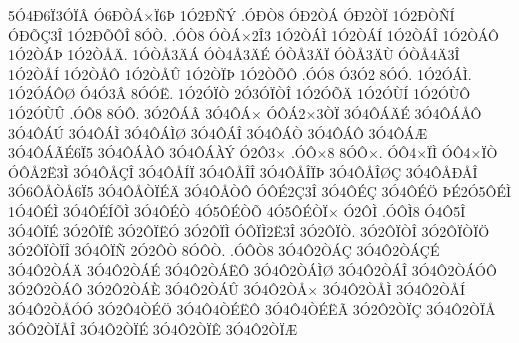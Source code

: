 {5^^d34^^d06^^cf3^^d3^^cf^^c2
^^d36^^d0^^d2^^c1^^d7^^cf6^^de
1^^d32^^d0^^d1^^dd
.^^d3^^d0^^d28
^^d3^^d02^^d2^^c1
^^d3^^d02^^d2^^cf
1^^d32^^d0^^d2^^d1^^cd
^^d3^^d0^^d5^^c73^^ce
1^^d32^^d0^^d5^^d4^^ce
8^^d3^^d2.
.^^d3^^d28
^^d3^^d2^^c1^^d72^^ce3
1^^d32^^d2^^c1^^cc
1^^d32^^d2^^c1^^cd
1^^d32^^d2^^c1^^ce
1^^d32^^d2^^c1^^d4
1^^d32^^d2^^c1^^de
1^^d32^^d2^^c5^^c4.
1^^d3^^d2^^c53^^c4^^c1
^^d3^^d24^^c53^^c4^^c9
^^d3^^d2^^c53^^c4^^cf
^^d3^^d2^^c53^^c4^^d9
^^d3^^d2^^c54^^c43^^ce
1^^d32^^d2^^c5^^cd
1^^d32^^d2^^c5^^d4
1^^d32^^d2^^c5^^db
1^^d32^^d2^^cf^^de
1^^d32^^d2^^d5^^d4
.^^d3^^d38
^^d33^^d32
8^^d3^^d3.
1^^d32^^d3^^c1^^cc.
1^^d32^^d3^^c1^^d4^^d8
^^d34^^d33^^c2
8^^d3^^d3^^cb.
1^^d32^^d3^^cf^^d2
2^^d33^^d3^^cf^^d2^^ce
1^^d32^^d3^^d5^^c4
1^^d32^^d3^^d9^^cd
1^^d32^^d3^^d9^^d4
1^^d32^^d3^^d9^^db
.^^d3^^d48
8^^d3^^d4.
3^^d32^^d4^^c1^^c2
3^^d34^^d4^^c1^^d7
^^d3^^d4^^c12^^d73^^d2^^cf
3^^d34^^d4^^c1^^c4^^c9
3^^d34^^d4^^c1^^c5^^d4
3^^d34^^d4^^c1^^da
3^^d34^^d4^^c1^^cc
3^^d34^^d4^^c1^^cc^^d8
3^^d34^^d4^^c1^^ce
3^^d34^^d4^^c1^^d2
3^^d34^^d4^^c1^^d4
3^^d34^^d4^^c1^^c6
3^^d34^^d4^^c1^^c3^^c96^^cf5
3^^d34^^d4^^c1^^c0^^d4
3^^d34^^d4^^c1^^c0^^dd
^^d32^^d43^^d7
.^^d3^^d4^^d78
8^^d3^^d4^^d7.
^^d3^^d44^^d7^^cf^^cc
^^d3^^d44^^d7^^cf^^d2
^^d3^^d4^^c52^^cb3^^cc
3^^d34^^d4^^c5^^c7^^ce
3^^d34^^d4^^c5^^cd^^cf
3^^d34^^d4^^c5^^ce^^ce
3^^d34^^d4^^c5^^ce^^cf^^de
3^^d34^^d4^^c5^^ce^^d8^^c7
3^^d34^^d4^^c5^^d0^^c5^^ce
3^^d36^^d4^^c5^^d2^^c56^^cf5
3^^d34^^d4^^c5^^d2^^cf^^c9^^c4
3^^d34^^d4^^c5^^d2^^d4
^^d3^^d4^^c92^^c73^^ce
3^^d34^^d4^^c9^^c7
3^^d34^^d4^^c9^^d6
^^de^^c92^^d35^^d4^^c9^^cc
1^^d34^^d4^^c9^^cc
3^^d34^^d4^^c9^^cd^^d5^^cc
3^^d34^^d4^^c9^^d2
4^^d35^^d4^^c9^^d2^^d5
4^^d35^^d4^^c9^^d2^^cf^^d7
^^d32^^d4^^cc
.^^d3^^d4^^cc8
^^d34^^d45^^ce
3^^d34^^d4^^cf^^c9
3^^d32^^d4^^cf^^ca
3^^d32^^d4^^cf^^cb^^d3
3^^d32^^d4^^cf^^cc
^^d3^^d4^^cf^^cc2^^cb3^^ce
3^^d32^^d4^^cf^^d2.
3^^d32^^d4^^cf^^d2^^ce
3^^d32^^d4^^cf^^d2^^cf^^d6
3^^d32^^d4^^cf^^d2^^cf^^ce
3^^d34^^d4^^cf^^d1
2^^d32^^d4^^d2
8^^d3^^d4^^d2.
.^^d3^^d4^^d28
3^^d34^^d42^^d2^^c1^^c7
3^^d34^^d42^^d2^^c1^^c7^^c9
3^^d34^^d42^^d2^^c1^^c4
3^^d34^^d42^^d2^^c1^^c9
3^^d34^^d42^^d2^^c1^^cb^^d4
3^^d34^^d42^^d2^^c1^^cc^^d8
3^^d34^^d42^^d2^^c1^^ce
3^^d34^^d42^^d2^^c1^^d3^^d4
3^^d32^^d42^^d2^^c1^^d4
3^^d32^^d42^^d2^^c1^^c8
3^^d34^^d42^^d2^^c1^^db
3^^d34^^d42^^d2^^c5^^d7
3^^d34^^d42^^d2^^c5^^cc
3^^d34^^d42^^d2^^c5^^cd
3^^d34^^d42^^d2^^c5^^d3^^d3
3^^d32^^d44^^d2^^c9^^d6
3^^d34^^d44^^d2^^c9^^cb^^d4
3^^d34^^d44^^d2^^c9^^cb^^c3
3^^d32^^d42^^d2^^cf^^c7
3^^d34^^d42^^d2^^cf^^c5
3^^d3^^d42^^d2^^cf^^c5^^ce
3^^d34^^d42^^d2^^cf^^c9
3^^d34^^d42^^d2^^cf^^ca
3^^d34^^d42^^d2^^cf^^c6
}
